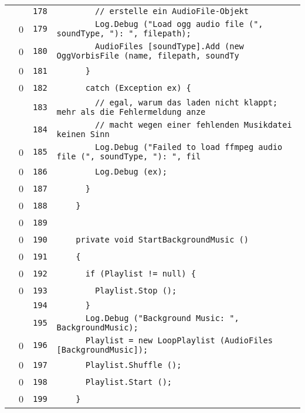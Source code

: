 \documentclass[a4paper,10pt]{article}
\begin{document}
\begin{longtable}[l]{lrrl}
\cellcolor{gray} &  & \verb~178~ & \verb~        // erstelle ein AudioFile-Objekt~\\
\cellcolor{red} & 0 & \verb~179~ & \verb~        Log.Debug ("Load ogg audio file (", soundType, "): ", filepath);~\\
\cellcolor{red} & 0 & \verb~180~ & \verb~        AudioFiles [soundType].Add (new OggVorbisFile (name, filepath, soundTy~\\
\cellcolor{red} & 0 & \verb~181~ & \verb~      }~\\
\cellcolor{red} & 0 & \verb~182~ & \verb~      catch (Exception ex) {~\\
\cellcolor{gray} &  & \verb~183~ & \verb~        // egal, warum das laden nicht klappt; mehr als die Fehlermeldung anze~\\
\cellcolor{gray} &  & \verb~184~ & \verb~        // macht wegen einer fehlenden Musikdatei keinen Sinn~\\
\cellcolor{red} & 0 & \verb~185~ & \verb~        Log.Debug ("Failed to load ffmpeg audio file (", soundType, "): ", fil~\\
\cellcolor{red} & 0 & \verb~186~ & \verb~        Log.Debug (ex);~\\
\cellcolor{red} & 0 & \verb~187~ & \verb~      }~\\
\cellcolor{red} & 0 & \verb~188~ & \verb~    }~\\
\cellcolor{red} & 0 & \verb~189~ & \verb~~\\
\cellcolor{red} & 0 & \verb~190~ & \verb~    private void StartBackgroundMusic ()~\\
\cellcolor{red} & 0 & \verb~191~ & \verb~    {~\\
\cellcolor{red} & 0 & \verb~192~ & \verb~      if (Playlist != null) {~\\
\cellcolor{red} & 0 & \verb~193~ & \verb~        Playlist.Stop ();~\\
\cellcolor{gray} &  & \verb~194~ & \verb~      }~\\
\cellcolor{gray} &  & \verb~195~ & \verb~      Log.Debug ("Background Music: ", BackgroundMusic);~\\
\cellcolor{red} & 0 & \verb~196~ & \verb~      Playlist = new LoopPlaylist (AudioFiles [BackgroundMusic]);~\\
\cellcolor{red} & 0 & \verb~197~ & \verb~      Playlist.Shuffle ();~\\
\cellcolor{red} & 0 & \verb~198~ & \verb~      Playlist.Start ();~\\
\cellcolor{red} & 0 & \verb~199~ & \verb~    }~\\

\end{longtable}
\end{document}
